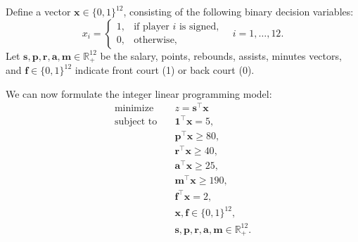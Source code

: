 \documentclass[a4paper,11pt]{article}
\begin{document}
Define a vector $\bm{x} \in \{0, 1\}^{12}$, consisting of the following binary decision variables:
$$x_i=\begin{cases}1,&\text{if player }i\text{ is signed,}\\0,&\text{otherwise,}\end{cases}\quad i=1,\dots,12.$$ 
Let
$\bm{s},\bm{p},\bm{r},\bm{a},\bm{m}\in\mathbb{R}_{+}^{12}$ be the salary, points, rebounds, assists, minutes vectors, and
$\bm{f}\in\{0,1\}^{12}$ indicate front court (1) or back court (0).

\vspace{1em}
We can now formulate the integer linear programming model:
\[
\begin{aligned}
\text{minimize} \quad & z=\bm{s}^\top\bm{x}\\
\text{subject to}\quad
&\bm{1}^\top\bm{x}=5,\\
&\bm{p}^\top\bm{x}\ge80,\\
&\bm{r}^\top\bm{x}\ge40,\\
&\bm{a}^\top\bm{x}\ge25,\\
&\bm{m}^\top\bm{x}\ge190,\\
&\bm{f}^\top\bm{x}=2, \\
&\bm{x}, \bm{f} \in \{0,1\}^{12}, \\
&\bm{s}, \bm{p}, \bm{r}, \bm{a}, \bm{m} \in \mathbb{R}_+^{12}.
\end{aligned}
\]
\end{document}

